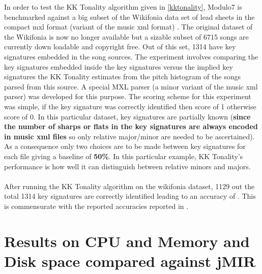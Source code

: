 \noindent In order to test the KK Tonality algorithm given in \ref{kktonality}, Modulo7 is benchmarked against a big subset of the Wikifonia data set of lead sheets in the compact mxl format (variant of the music xml format) \cite{WikifoniaDataset}. The original dataset of the Wikifonia is now no longer available but a sizable subset of 6715 songs are currently down loadable and copyright free. Out of this set, 1314 have key signatures embedded in the song sources. The experiment involves comparing the key signatures embedded inside the key signatures versus the implied key signatures the KK Tonality estimates from the pitch histogram of the songs parsed from this source. A special MXL parser (a minor variant of the music xml parser) was developed for this purpose. The scoring scheme for this experiment was simple, if the key signature was correctly identified then score of 1 otherwise score of 0. In this particular dataset, key signatures are partially known (\textbf{since the number of sharps or flats in the key signatures are always encoded in music xml files} so only relative major/minor are needed to be ascertained). As a consequence only two choices are to be made between key signatures for each file giving a baseline of \textbf{50\%}. In this particular example, KK Tonality's performance is how well it can distinguish between relative minors and majors. \\\\
After running the KK Tonality algorithm on the wikifonia dataset, 1129 out the total 1314 key signatures are correctly identified leading to an accuracy of . This is commensurate with the reported accuracies reported in \cite{kkTonalityKeyFinding}. 

\section{Results on CPU and Memory and Disk space compared against jMIR}

